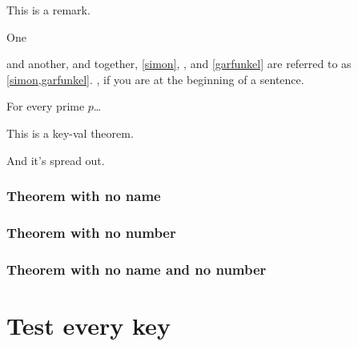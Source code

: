 \begin{remark}[name=AAA,label=abc]
This is a remark.
\end{remark}


\begin{callmeal}[Simon]\label{simon}
One
\end{callmeal}
\begin{callmeal}\label{garfunkel}
and another, and together,
\autoref{simon}, ,
and \cref{garfunkel} are referred
to as \cref{simon,garfunkel}.
, if you are at
the beginning of a sentence.
\end{callmeal}


\begin{styledtheorem}[Euclid]
For every prime $p$\dots
\end{styledtheorem}

\ifthmtools
\firsteuclid*
\else
\firsteuclid
\fi

\begin{theorem}[name=Keyed theorem,
label=thm:key]
This is a
key-val theorem.
\end{theorem}
\begin{theorem}[continues=thm:key]
And it’s spread out.
\end{theorem}

\subsection{Theorem with no name}

\begin{noname}
\kant[2][1]
\end{noname}

\begin{noname}[heading]
\kant[2][1]
\end{noname}

\subsection{Theorem with no number}

\begin{euclid}
\kant[2][1]
\end{euclid}

\begin{euclid}[heading]
\kant[2][1]
\end{euclid}

\subsection{Theorem with no name and no number}

\begin{nonamenonumber}
\kant[2][1]
\end{nonamenonumber}

\begin{nonamenonumber}[heading]
\kant[2][1]
\end{nonamenonumber}

\chapter{Test every key}

\PrintTheorems